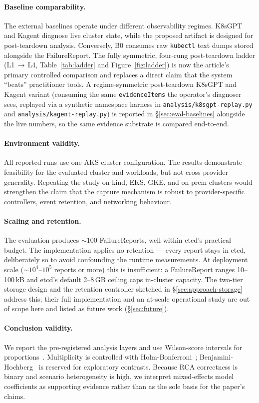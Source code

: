 \documentclass[sigconf, nonacm=true, anonymous=false, review=false]{acmart}
\newcommand{\fp}{FailureReport\xspace}
\begin{document}
\paragraph{Baseline comparability.} The external baselines operate under
different observability regimes. K8sGPT and Kagent diagnose live cluster
state, while the proposed artifact is designed for post-teardown analysis.
Conversely, B0 consumes raw \texttt{kubectl} text dumps stored alongside
the FailureReport. The fully symmetric, four-rung post-teardown ladder
(L1\,$\to$\,L4, Table~\ref{tab:ladder} and Figure~\ref{fig:ladder}) is now
the article's primary controlled comparison and replaces a direct claim that
the system ``beats'' practitioner tools. A regime-symmetric post-teardown
K8sGPT and Kagent variant (consuming the same \texttt{evidenceItems} the
operator's diagnoser sees, replayed via a synthetic namespace harness in
\texttt{analysis/k8sgpt-replay.py} and \texttt{analysis/kagent-replay.py})
is reported in \S\ref{sec:eval-baselines} alongside the live numbers, so
the same evidence substrate is compared end-to-end.

\paragraph{Environment validity.} All reported runs use one AKS cluster
configuration. The results demonstrate feasibility for the evaluated
cluster and workloads, but not cross-provider generality. Repeating the
study on kind, EKS, GKE, and on-prem clusters would strengthen the claim
that the capture mechanism is robust to provider-specific controllers,
event retention, and networking behaviour.

\paragraph{Scaling and retention.} The evaluation produces $\sim$100
\fp{}s, well within etcd's practical budget. The implementation
applies no retention --- every report stays in etcd, deliberately so
to avoid confounding the runtime measurements. At deployment scale
($\sim$$10^4$--$10^5$ reports or more) this is insufficient: a \fp{}
ranges 10--100\,kB and etcd's default 2--8\,GB ceiling caps in-cluster
capacity. The two-tier storage design and the retention controller
sketched in §\ref{sec:approach-storage} address this; their full
implementation and an at-scale operational study are out of scope here
and listed as future work (§\ref{sec:future}).

\paragraph{Conclusion validity.} We report the pre-registered analysis
layers and use Wilson-score intervals for proportions~\cite{wilson_score_ci}.
Multiplicity is controlled with Holm-Bonferroni~\cite{holm_1979};
Benjamini-Hochberg~\cite{benjamini_hochberg_1995} is reserved for
exploratory contrasts. Because RCA correctness is binary and scenario
heterogeneity is high, we interpret mixed-effects model coefficients as
supporting evidence rather than as the sole basis for the paper's claims.
\end{document}
